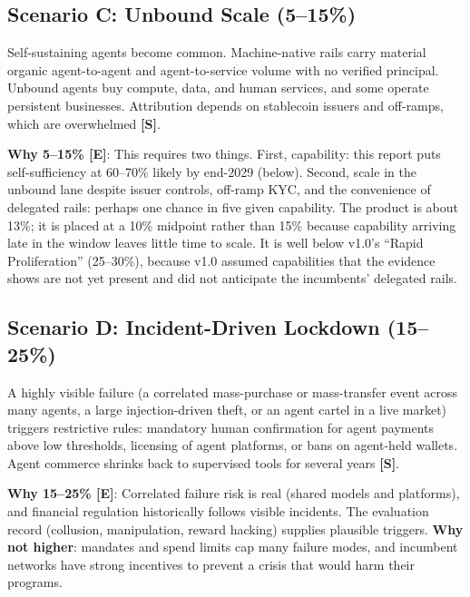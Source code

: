 \documentclass[11pt,letterpaper]{article}
\begin{document}
\subsection[Scenario C: Unbound Scale]{Scenario C: Unbound Scale (5--15\%)}

\begin{scenariobox}
Self-sustaining agents become common. Machine-native rails carry material organic agent-to-agent and agent-to-service volume with no verified principal. Unbound agents buy compute, data, and human services, and some operate persistent businesses. Attribution depends on stablecoin issuers and off-ramps, which are overwhelmed \textbf{[S]}.

\textbf{Why 5--15\% [E]}: This requires two things. First, capability: this report puts self-sufficiency at 60--70\% likely by end-2029 (below). Second, scale in the unbound lane despite issuer controls, off-ramp KYC, and the convenience of delegated rails: perhaps one chance in five given capability. The product is about 13\%; it is placed at a 10\% midpoint rather than 15\% because capability arriving late in the window leaves little time to scale. It is well below v1.0's ``Rapid Proliferation'' (25--30\%), because v1.0 assumed capabilities that the evidence shows are not yet present and did not anticipate the incumbents' delegated rails.
\end{scenariobox}

\subsection[Scenario D: Incident-Driven Lockdown]{Scenario D: Incident-Driven Lockdown (15--25\%)}

\begin{scenariobox}
A highly visible failure (a correlated mass-purchase or mass-transfer event across many agents, a large injection-driven theft, or an agent cartel in a live market) triggers restrictive rules: mandatory human confirmation for agent payments above low thresholds, licensing of agent platforms, or bans on agent-held wallets. Agent commerce shrinks back to supervised tools for several years \textbf{[S]}.

\textbf{Why 15--25\% [E]}: Correlated failure risk is real (shared models and platforms), and financial regulation historically follows visible incidents. The evaluation record (collusion, manipulation, reward hacking) supplies plausible triggers. \textbf{Why not higher}: mandates and spend limits cap many failure modes, and incumbent networks have strong incentives to prevent a crisis that would harm their programs.
\end{scenariobox}
\end{document}
